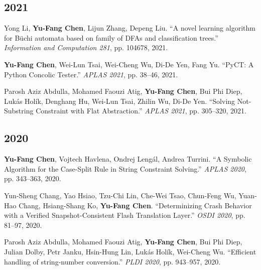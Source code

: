 \documentclass[10.5pt]{article}
\begin{document}
\subsection*{2021}
\begin{enumerate}[leftmargin=*,label={[\arabic*]},resume]
\item Yong Li, \textbf{Yu-Fang Chen}, Lijun Zhang, Depeng Liu. ``A novel learning algorithm for Büchi automata based on family of DFAs and classification trees.'' \emph{Information and Computation 281}, pp. 104678, 2021.
\item \textbf{Yu-Fang Chen}, Wei-Lun Tsai, Wei-Cheng Wu, Di-De Yen, Fang Yu. ``PyCT: A Python Concolic Tester.'' \emph{APLAS 2021}, pp. 38--46, 2021.
\item Parosh Aziz Abdulla, Mohamed Faouzi Atig, \textbf{Yu-Fang Chen}, Bui Phi Diep, Lukás Holík, Denghang Hu, Wei-Lun Tsai, Zhilin Wu, Di-De Yen. ``Solving Not-Substring Constraint with Flat Abstraction.'' \emph{APLAS 2021}, pp. 305--320, 2021.
\end{enumerate}
\subsection*{2020}
\begin{enumerate}[leftmargin=*,label={[\arabic*]},resume]
\item \textbf{Yu-Fang Chen}, Vojtech Havlena, Ondrej Lengál, Andrea Turrini. ``A Symbolic Algorithm for the Case-Split Rule in String Constraint Solving.'' \emph{APLAS 2020}, pp. 343--363, 2020.
\item Yun-Sheng Chang, Yao Hsiao, Tzu-Chi Lin, Che-Wei Tsao, Chun-Feng Wu, Yuan-Hao Chang, Hsiang-Shang Ko, \textbf{Yu-Fang Chen}. ``Determinizing Crash Behavior with a Verified Snapshot-Consistent Flash Translation Layer.'' \emph{OSDI 2020}, pp. 81--97, 2020.
\item Parosh Aziz Abdulla, Mohamed Faouzi Atig, \textbf{Yu-Fang Chen}, Bui Phi Diep, Julian Dolby, Petr Janku, Hsin-Hung Lin, Lukás Holík, Wei-Cheng Wu. ``Efficient handling of string-number conversion.'' \emph{PLDI 2020}, pp. 943--957, 2020.
\end{enumerate}
\end{document}
